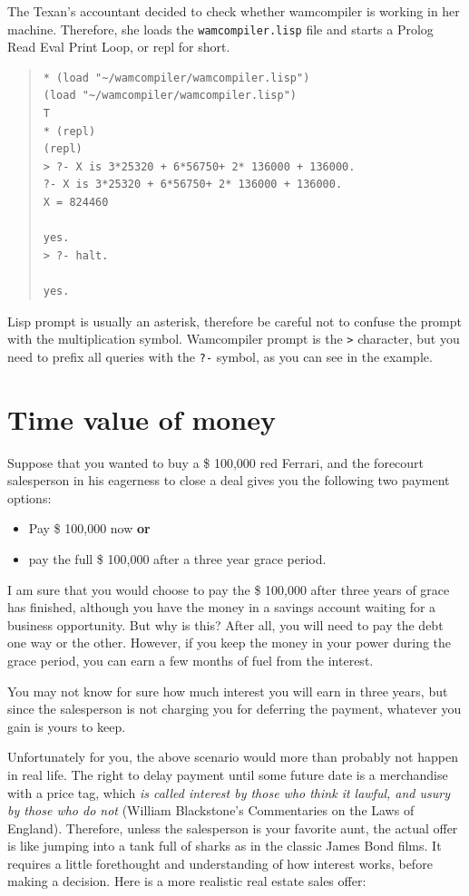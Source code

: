 \documentclass[a4paper,12pt]{book}
\begin{document}
The Texan's accountant decided to check whether
wamcompiler is working in her machine. Therefore,
she loads the \verb|wamcompiler.lisp| file and
starts a Prolog Read Eval Print Loop, or repl for
short.
\begin{quote}
\begin{verbatim}
* (load "~/wamcompiler/wamcompiler.lisp")
(load "~/wamcompiler/wamcompiler.lisp")
T
* (repl)
(repl)
> ?- X is 3*25320 + 6*56750+ 2* 136000 + 136000.
?- X is 3*25320 + 6*56750+ 2* 136000 + 136000.
X = 824460

yes.
> ?- halt.

yes.
\end{verbatim}
\end{quote}

Lisp prompt is usually an asterisk, therefore
be careful not to confuse the prompt with the
multiplication symbol. Wamcompiler prompt is
the \verb|>| character, but you need to prefix
all queries with the \verb|?-| symbol, as you
can see in the example.

\section{Time value of money}
Suppose that you wanted to buy a \$ 100,000 red Ferrari,
and the forecourt salesperson in his eagerness to
close a deal gives you the following two payment options:  
\begin{itemize}
\item Pay \$ 100,000 now {\bf or}
\item pay the full \$ 100,000 after a three year grace period.
\end{itemize}

I am sure that you would choose to pay the \$ 100,000 after
three years of grace has finished, although you have the
money in a savings account waiting for a business
opportunity. But why is this? After all, you will need
to pay the debt one way or the other. However, if you
keep the money in your power during the grace period,
you can earn a few months of fuel from the interest.

You may not know for sure how much interest you
will earn in three years, but since the salesperson
is not charging you for deferring the payment,
whatever you gain is yours to keep.

Unfortunately for you, the above scenario would
more than probably not happen in real life.
The right to delay payment until some future
date is a merchandise with a price tag,
which {\em is called interest by those who
think it lawful, and usury by those who
do not} (William Blackstone's Commentaries
on the Laws of England). Therefore, unless
the salesperson is your favorite aunt,
the actual offer is like jumping into a tank
full of sharks as in the classic James Bond films.
It requires a little forethought and understanding
of how interest works, before making a decision.
Here is a more realistic real estate sales offer:
\end{document}
